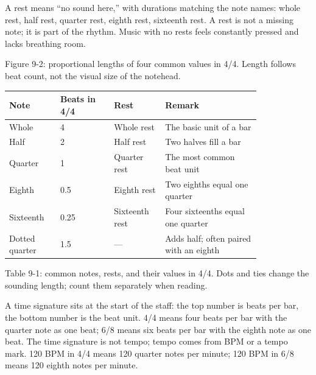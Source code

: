 A rest means ``no sound here,'' with durations matching the note names: whole rest, half rest, quarter rest, eighth rest, sixteenth rest. A rest is not a missing note; it is part of the rhythm. Music with no rests feels constantly pressed and lacks breathing room.

\begin{center}
\begin{minipage}{0.94\linewidth}
\centering
{}

Figure 9-2: proportional lengths of four common values in 4/4. Length follows beat count, not the visual size of the notehead.
\end{minipage}
\end{center}

\begin{center}
\small
\begin{tabular}{p{0.16\linewidth}p{0.18\linewidth}p{0.16\linewidth}p{0.32\linewidth}}
\toprule
Note & Beats in 4/4 & Rest & Remark \\
\midrule
Whole & 4 & Whole rest & The basic unit of a bar \\
Half & 2 & Half rest & Two halves fill a bar \\
Quarter & 1 & Quarter rest & The most common beat unit \\
Eighth & 0.5 & Eighth rest & Two eighths equal one quarter \\
Sixteenth & 0.25 & Sixteenth rest & Four sixteenths equal one quarter \\
Dotted quarter & 1.5 & --- & Adds half; often paired with an eighth \\
\bottomrule
\end{tabular}

Table 9-1: common notes, rests, and their values in 4/4. Dots and ties change the sounding length; count them separately when reading.
\end{center}

A time signature sits at the start of the staff: the top number is beats per bar, the bottom number is the beat unit. 4/4 means four beats per bar with the quarter note as one beat; 6/8 means six beats per bar with the eighth note as one beat. The time signature is not tempo; tempo comes from BPM or a tempo mark. 120 BPM in 4/4 means 120 quarter notes per minute; 120 BPM in 6/8 means 120 eighth notes per minute.

